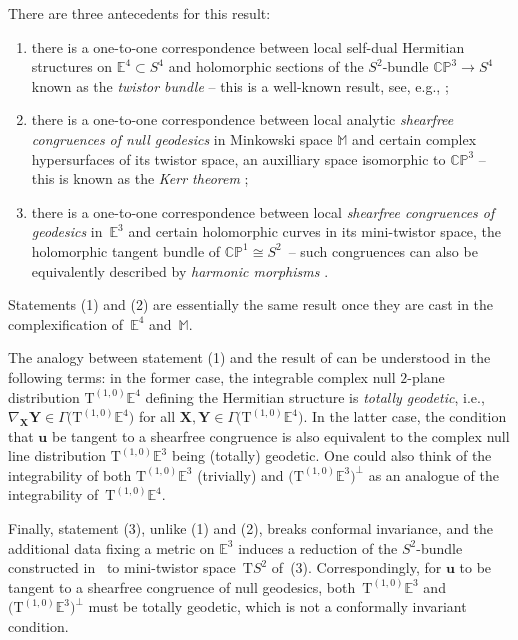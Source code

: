 \documentclass[pdftex]{sigma}
\numberwithin{equation}{section}
\newcommand{\Tgt} {\mathrm{T}}
\newcommand{\E} {\mathbb{E}}
\newcommand{\M} {\mathbb{M}}
\newcommand{\CP} {\mathbb{CP}}
\begin{document}
There are three antecedents for this result:
\begin{enumerate}\itemsep=0pt
\item[1)] %
there is a one-to-one correspondence between local self-dual Hermitian structures on \mbox{$\E^4 {\subset} S^4$} and holomorphic sections of the $S^2$-bundle $\CP^3 \rightarrow S^4$ known as the \emph{twistor bundle} -- this is a well-known result, see, e.g., \cite{Baird2013,Baird2003, Eells1985,Hughston1988,Salamon2009};
\item[2)] %
there is a one-to-one correspondence between local analytic \emph{shearfree congruences of null geodesics} in Minkowski space $\M$ and certain complex hypersurfaces of its twistor space, an auxilliary space isomorphic to $\CP^3$ -- this is known as the \emph{Kerr theorem} \cite{Cox1976,Penrose1967,Penrose1986};
\item[3)] %
there is a one-to-one correspondence between local \emph{shearfree congruences of geodesics} in~$\E^3$ and certain holomorphic curves in its mini-twistor space, the holomorphic tangent bundle of $\CP^1 \cong S^2$~-- such congruences can also be equivalently described by \emph{harmonic morphisms} \cite{Baird1988,Tod1995,Tod1995a}.
\end{enumerate}
Statements (1) and (2) are essentially the same result once they are cast in the complexif\/ication of~$\E^4$ and~$\M$.

The analogy between statement (1) and the result of \cite{Baird2013} can be understood in the following terms: in the former case, the integrable complex null $2$-plane distribution $\Tgt^{(1,0)} \E^4$ def\/ining the Hermitian structure is \emph{totally geodetic}, i.e., $\nabla_{\bm{X}} \bm{Y} \in \Gamma \big(\Tgt^{(1,0)} \E^4\big)$ for all $\bm{X},\bm{Y} \in \Gamma \big(\Tgt^{(1,0)} \E^4\big)$. In the latter case, the condition that $\bm{u}$ be tangent to a shearfree congruence is also equivalent to the complex null line distribution $\Tgt^{(1,0)} \E^3$ being (totally) geodetic. One could also think of the integrability of both $\Tgt^{(1,0)} \E^3$ (trivially) and $\big(\Tgt^{(1,0)} \E^3\big)^\perp$ as an analogue of the integrability of~$\Tgt^{(1,0)} \E^4$.

 Finally, statement (3), unlike (1) and (2), breaks conformal invariance, and the additional data f\/ixing a metric on $\E^3$ induces a reduction of the $S^2$-bundle constructed in~\cite{Baird2013} to mini-twistor space~$\Tgt S^2$ of~(3). Correspondingly, for $\bm{u}$ to be tangent to a shearfree congruence of null geodesics, both~$\Tgt^{(1,0)} \E^3$ and $\big(\Tgt^{(1,0)} \E^3\big)^\perp$ must be totally geodetic, which is not a conformally invariant condition.
\end{document}
